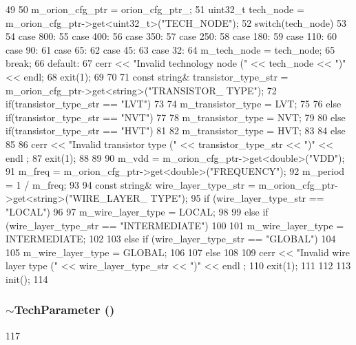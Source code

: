 \begin{DoxyCode}
49 {
50     m_orion_cfg_ptr = orion_cfg_ptr_;
51     uint32_t tech_node = m_orion_cfg_ptr->get<uint32_t>("TECH_NODE");
52     switch(tech_node)
53     {
54         case 800:
55         case 400:
56         case 350:
57         case 250:
58         case 180:
59         case 110:
60         case 90:
61         case 65:
62         case 45:
63         case 32:
64             m_tech_node = tech_node;
65             break;
66         default:
67             cerr << "Invalid technology node (" << tech_node << ")" << endl;
68             exit(1);
69     }
70 
71     const string& transistor_type_str = m_orion_cfg_ptr->get<string>("TRANSISTOR_
      TYPE");
72     if(transistor_type_str == "LVT")
73     {
74         m_transistor_type = LVT;
75     }
76     else if(transistor_type_str == "NVT")
77     {
78         m_transistor_type = NVT;
79     }
80     else if(transistor_type_str == "HVT")
81     {
82         m_transistor_type = HVT;
83     }
84     else
85     {
86         cerr << "Invalid transistor type (" << transistor_type_str << ")" << endl
      ;
87         exit(1);
88     }
89 
90     m_vdd = m_orion_cfg_ptr->get<double>("VDD");
91     m_freq = m_orion_cfg_ptr->get<double>("FREQUENCY");
92     m_period = 1 / m_freq;
93 
94     const string& wire_layer_type_str = m_orion_cfg_ptr->get<string>("WIRE_LAYER_
      TYPE");
95     if (wire_layer_type_str == "LOCAL")
96     {
97         m_wire_layer_type = LOCAL;
98     }
99     else if (wire_layer_type_str == "INTERMEDIATE")
100     {
101         m_wire_layer_type = INTERMEDIATE;
102     }
103     else if (wire_layer_type_str == "GLOBAL")
104     {
105         m_wire_layer_type = GLOBAL;
106     }
107     else
108     {
109         cerr << "Invalid wire layer type (" << wire_layer_type_str << ")" << endl
      ;
110         exit(1);
111     }
112 
113     init();
114 }
\end{DoxyCode}
\hypertarget{classTechParameter_aa7c01789876ebc190e4efe412bfb3435}{
\subsubsection[{$\sim$TechParameter}]{\setlength{\rightskip}{0pt plus 5cm}$\sim${\bf TechParameter} ()}}
\label{classTechParameter_aa7c01789876ebc190e4efe412bfb3435}



\begin{DoxyCode}
117 {}
\end{DoxyCode}


